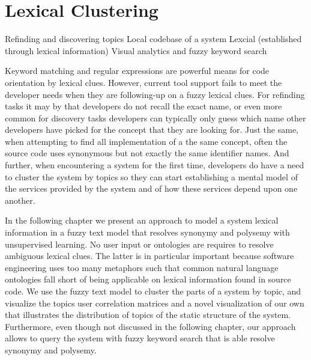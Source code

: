 

\chapter{Lexical Clustering}
\label{the chapter on lexical clues}

\infobox
	{Refinding and discovering topics}
	{Local codebase of a system}
	{Lexcial (established through lexical information)}
	{Visual analytics and fuzzy keyword search}

Keyword matching and regular expressions are powerful means for code orientation by lexical clues. However, current tool support fails to meet the developer needs when they are following-up on a fuzzy lexical clues. For refinding tasks it may by that developers do not recall the exact name, or even more common for discovery tasks developers can typically only guess which name other developers have picked for the concept that they are looking for. Just the same, when attempting to find all implementation of a the same concept, often the source code uses synonymous but not exactly the same identifier names. And further, when encountering a system for the first time, developers do have a need to cluster the system by topics so they can start establishing a mental model of the services provided by the system and of how these services depend upon one another. 

In the following chapter we present an approach to model a system lexical information in a fuzzy text model that resolves synonymy and polysemy with unsupervised learning. No user input or ontologies are requires to resolve ambiguous lexical clues. The latter is in particular important because software engineering uses too many metaphors such that common natural language ontologies fall short of being applicable on lexical information found in source code. We use the fuzzy text model to cluster the parts of a system by topic, and visualize the topics user correlation matrices and a novel visualization of our own that illustrates the distribution of topics of the static structure of the system. Furthermore, even though not discussed in the following chapter, our approach allows to query the system with fuzzy keyword search that is able resolve synonymy and polysemy.

\asteriskasteriskasterisk

